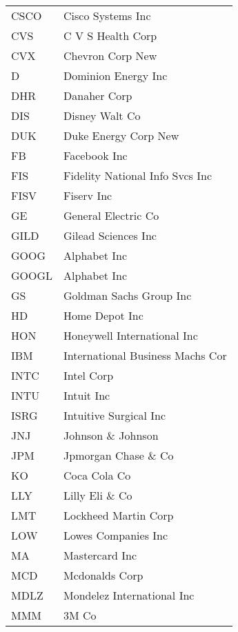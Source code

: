 \begin{tabular}{ll}
CSCO   &                 Cisco Systems Inc \\
CVS    &                 C V S Health Corp \\
CVX    &                  Chevron Corp New \\
D      &               Dominion Energy Inc \\
DHR    &                      Danaher Corp \\
DIS    &                    Disney Walt Co \\
DUK    &              Duke Energy Corp New \\
FB     &                      Facebook Inc \\
FIS    &   Fidelity National Info Svcs Inc \\
FISV   &                        Fiserv Inc \\
GE     &               General Electric Co \\
GILD   &               Gilead Sciences Inc \\
GOOG   &                      Alphabet Inc \\
GOOGL  &                      Alphabet Inc \\
GS     &           Goldman Sachs Group Inc \\
HD     &                    Home Depot Inc \\
HON    &       Honeywell International Inc \\
IBM    &  International Business Machs Cor \\
INTC   &                        Intel Corp \\
INTU   &                        Intuit Inc \\
ISRG   &            Intuitive Surgical Inc \\
JNJ    &                Johnson \& Johnson \\
JPM    &              Jpmorgan Chase \& Co \\
KO     &                      Coca Cola Co \\
LLY    &                   Lilly Eli \& Co \\
LMT    &              Lockheed Martin Corp \\
LOW    &               Lowes Companies Inc \\
MA     &                    Mastercard Inc \\
MCD    &                    Mcdonalds Corp \\
MDLZ   &        Mondelez International Inc \\
MMM    &                             3M Co \\

\end{tabular}
